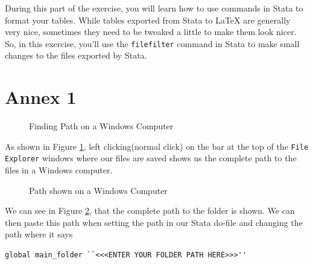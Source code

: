 \documentclass[]{article}
\begin{document}
During this part of the exercise, you will learn how to use commands in Stata to format your tables. While tables exported from Stata to {\LaTeX} are generally very nice, sometimes they need to be tweaked a little to make them look nicer. So, in this exercise, you'll use the \texttt{filefilter} command in Stata to make small changes to the files exported by Stata. 

\newpage
\section*{Annex 1} {\label{annex1}}

\begin{figure}[H]
	\centering
	\caption{Finding Path on a Windows Computer}
	\label{fig:pathwin}
\end{figure}
As shown in Figure \ref{fig:pathwin}, left clicking(normal click) on the bar at the top of the \texttt{File Explorer} windows where our files are saved shows us the complete path to the files in a Windows computer. \\

\begin{figure}[H]
	\centering
	\caption{Path shown on a Windows Computer}
	\label{fig:pathwin2}
\end{figure}

We can see in Figure \ref{fig:pathwin2}, that the complete path to the folder is shown. We can then paste this path when setting the path in our Stata do-file and changing the path where it says \begin{verbatim}
global main_folder ``<<<ENTER YOUR FOLDER PATH HERE>>>''
\end{verbatim} 
	
\end{document}
